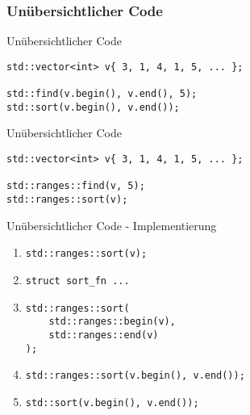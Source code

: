 \subsubsection{Unübersichtlicher Code}

\begin{frame}[fragile]{Unübersichtlicher Code}
    \begin{verbatim}
std::vector<int> v{ 3, 1, 4, 1, 5, ... };

std::find(v.begin(), v.end(), 5);
std::sort(v.begin(), v.end());
    \end{verbatim}
\end{frame}

\begin{frame}[fragile]{Unübersichtlicher Code}
    \begin{verbatim}
std::vector<int> v{ 3, 1, 4, 1, 5, ... };

std::ranges::find(v, 5);
std::ranges::sort(v);
    \end{verbatim}
\end{frame}

\begin{frame}[fragile]{Unübersichtlicher Code - Implementierung}
    \begin{enumerate}
        \item<1-> \texttt{std::ranges::sort(v);}
        \item<2-> \texttt{struct sort_fn {...}}
        \item<3-> \begin{verbatim}
std::ranges::sort(
    std::ranges::begin(v),
    std::ranges::end(v)
);
            \end{verbatim}
        \item<4-> \texttt{std::ranges::sort(v.begin(), v.end());}
        \item<5-> \texttt{std::sort(v.begin(), v.end());}
    \end{enumerate}
\end{frame}